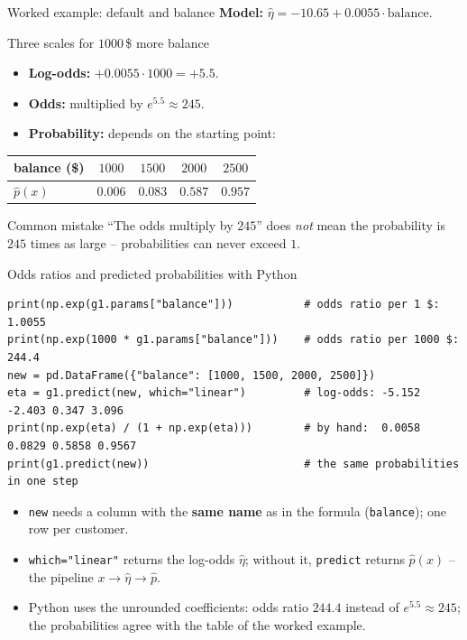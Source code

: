 \documentclass[aspectratio=169,11pt]{beamer}
\begin{document}
\begin{frame}{Worked example: default and balance}
  \textbf{Model:} $\hat\eta=-10.65+0.0055\cdot\text{balance}$.
  \begin{exampleblock}{Three scales for $1000$\,\$ more balance}
    \begin{itemize}\setlength{\itemsep}{3pt}
      \item \textbf{Log-odds:} $+0.0055\cdot1000=+5.5$.
      \item \textbf{Odds:} multiplied by $e^{5.5}\approx245$.
      \item \textbf{Probability:} depends on the starting point:
    \end{itemize}
    \begin{center}
      \renewcommand{\arraystretch}{1.2}
      \begin{tabular}{lcccc}
        \toprule
        balance (\$) & $1000$ & $1500$ & $2000$ & $2500$\\
        \midrule
        $\hat p(x)$ & $0.006$ & $0.083$ & $0.587$ & $0.957$\\
        \bottomrule
      \end{tabular}
    \end{center}
  \end{exampleblock}
  \begin{alertblock}{Common mistake}
    ``The odds multiply by $245$'' does \emph{not} mean the probability is
    $245$ times as large -- probabilities can never exceed $1$.
  \end{alertblock}
\end{frame}

\begin{frame}[fragile]{Odds ratios and predicted probabilities with Python}
\begin{lstlisting}
print(np.exp(g1.params["balance"]))           # odds ratio per 1 $:     1.0055
print(np.exp(1000 * g1.params["balance"]))    # odds ratio per 1000 $:  244.4
new = pd.DataFrame({"balance": [1000, 1500, 2000, 2500]})
eta = g1.predict(new, which="linear")         # log-odds: -5.152 -2.403 0.347 3.096
print(np.exp(eta) / (1 + np.exp(eta)))        # by hand:  0.0058 0.0829 0.5858 0.9567
print(g1.predict(new))                        # the same probabilities in one step
\end{lstlisting}
  \begin{itemize}\setlength{\itemsep}{3pt}
    \item \texttt{new} needs a column with the \textbf{same name} as in the
          formula (\texttt{balance}); one row per customer.
    \item \texttt{which="linear"} returns the log-odds $\hat\eta$; without it,
          \texttt{predict} returns $\hat p(x)$ -- the pipeline
          $x\to\hat\eta\to\hat p$.
    \item Python uses the unrounded coefficients: odds ratio $244.4$ instead
          of $e^{5.5}\approx245$; the probabilities agree with the table of
          the worked example.
  \end{itemize}
\end{frame}
\end{document}
